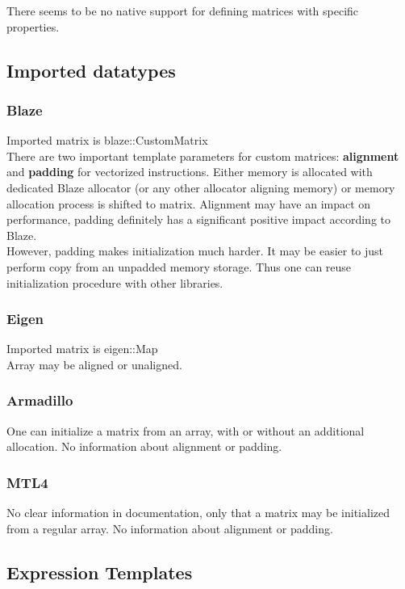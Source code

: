 \documentclass{article}
\begin{document}
There seems to be no native support for defining matrices with specific properties.

\subsection{Imported datatypes}

\subsubsection{Blaze}

Imported matrix is blaze::CustomMatrix\cite{blazeCustom} \\
There are two important template parameters for custom matrices: \textbf{alignment} and \textbf{padding} for vectorized instructions. Either memory is allocated with dedicated Blaze allocator (or any other allocator aligning memory) or memory allocation process is shifted to matrix. Alignment may have an impact on performance, padding definitely has a significant positive impact according to Blaze.\\
However, padding makes initialization much harder. It may be easier to just perform copy from an unpadded memory storage. Thus one can reuse initialization procedure with other libraries.

\subsubsection{Eigen}
Imported matrix is eigen::Map\cite{eigenImport} \\
Array may be aligned or unaligned.

\subsubsection{Armadillo}
One can initialize a matrix from an array\cite{armaImport}, with or without an additional allocation. No information about alignment or padding.

\subsubsection{MTL4}
No clear information in documentation, only that a matrix may be initialized from a regular array\cite{mtlImport}. No information about alignment or padding.

\subsection{Expression Templates}
\end{document}
